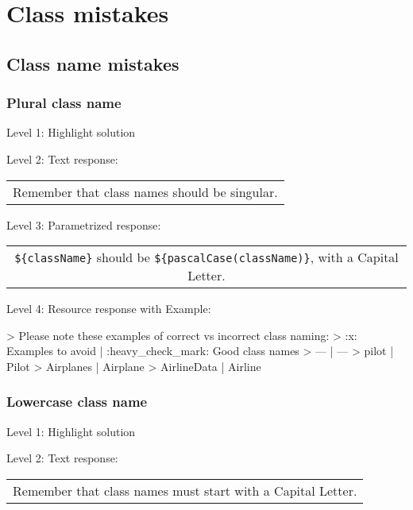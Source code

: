 

\section{Class mistakes}

\subsection{Class name mistakes}

\subsubsection{Plural class name}

\noindent Level 1: Highlight solution \medskip

\noindent Level 2: Text response: \medskip

\begin{tabular}{|c}
Remember that class names should be singular.
\end{tabular} \medskip

\noindent Level 3: Parametrized response: \medskip

\begin{tabular}{|c}
\verb|${className}| should be \verb|${pascalCase(className)}|, with a Capital Letter.
\end{tabular} \medskip

\noindent Level 4: Resource response with Example:

> Please note these examples of correct vs incorrect class naming:
> :x: Examples to avoid | :heavy_check_mark: Good class names
> --- | ---
> pilot | Pilot
> Airplanes | Airplane 
> AirlineData | Airline


\subsubsection{Lowercase class name}

\noindent Level 1: Highlight solution \medskip

\noindent Level 2: Text response: \medskip

\begin{tabular}{|c}
Remember that class names must start with a Capital Letter.
\end{tabular} \medskip

